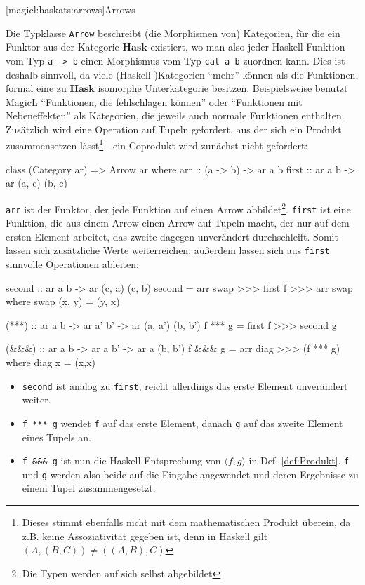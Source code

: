 \documentclass[a4paper, bibgerm]{article}
\newcommand\icode[1]{\lstinline?#1?}
\newcommand\lsubsubsection{}
\newcommand{\dref}[1]{Def. \ref{def:#1}}
\begin{document}
\lsubsubsection[magicl:haskats:arrows]{Arrows}

Die Typklasse \icode{Arrow} beschreibt (die Morphismen von) Kategorien,
für die ein Funktor aus der Kategorie $\mathbf{Hask}$ existiert, wo man
also jeder Haskell-Funktion vom Typ \icode{a -> b} einen Morphismus vom
Typ \icode{cat a b} zuordnen kann. Dies ist deshalb sinnvoll, da viele
(Haskell-)Kategorien "`mehr"' können als die Funktionen, formal eine zu
$\mathbf{Hask}$ isomorphe Unterkategorie besitzen. Beispielsweise
benutzt MagicL "`Funktionen, die fehlschlagen können"' oder "`Funktionen
mit Nebeneffekten"' als Kategorien, die jeweils auch normale Funktionen
enthalten. Zusätzlich wird eine Operation auf Tupeln gefordert, aus der
sich ein Produkt zusammensetzen lässt\footnote{Dieses stimmt ebenfalls
  nicht mit dem mathematischen Produkt überein, da z.B. keine
  Assoziativität gegeben ist, denn in Haskell gilt $(A, (B, C)) \neq
  ((A, B), C)$} - ein Coprodukt wird zunächst nicht gefordert:
\begin{code}
class (Category ar) => Arrow ar where
  arr   :: (a -> b) -> ar a b
  first :: ar a b  -> ar (a, c) (b, c)
\end{code}
\icode{arr} ist der Funktor, der jede Funktion auf einen Arrow
abbildet\footnote{Die Typen werden auf sich selbst abgebildet}.
\icode{first} ist eine Funktion, die aus einem Arrow einen Arrow auf
Tupeln macht, der nur auf dem ersten Element arbeitet, das zweite
dagegen unverändert durchschleift. Somit lassen sich zusätzliche Werte
weiterreichen, außerdem lassen sich aus \icode{first} sinnvolle
Operationen ableiten:

\begin{code}
  second :: ar a b -> ar (c, a) (c, b)
  second = arr swap >>> first f >>> arr swap
    where swap (x, y) = (y, x)

  (***) :: ar a b -> ar a' b' -> ar (a, a') (b, b')
  f *** g = first f >>> second g

  (&&&) :: ar a b -> ar a b' -> ar a (b, b')
  f &&& g = arr diag >>> (f *** g)
    where diag x = (x,x)
\end{code}

\begin{itemize}
\item \icode{second} ist analog zu \icode{first}, reicht allerdings das erste
Element unverändert weiter.
\item \icode{f *** g} wendet \icode{f} auf das
erste Element, danach \icode{g} auf das zweite Element eines Tupels
an.
\item \icode{f &&& g} ist nun die Haskell-Entsprechung von $\langle f,g
\rangle$ in \dref{Produkt}. \icode{f} und \icode{g} werden also beide
auf die Eingabe angewendet und deren Ergebnisse zu einem Tupel
zusammengesetzt.
\end{itemize}
\end{document}
